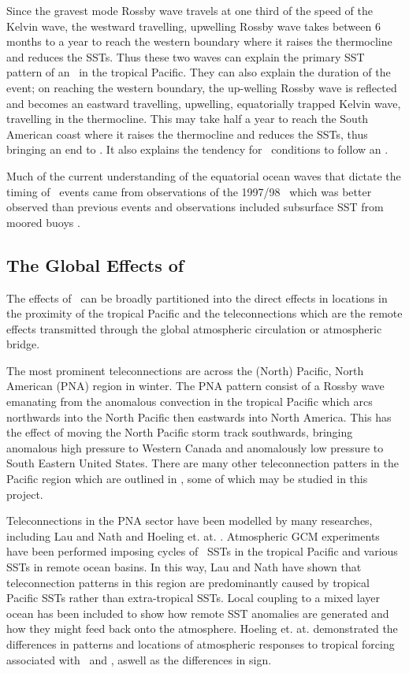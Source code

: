 Since the gravest mode Rossby wave travels at one third of the speed
of the Kelvin wave, the westward travelling, upwelling Rossby wave
takes between 6 months 
to a year to reach the western boundary where it raises the
thermocline and reduces the SSTs. Thus these two waves can explain the
primary SST pattern of an \elnino\ in the tropical Pacific. They can
also explain the duration of the event; on reaching the western
boundary, the up-welling Rossby wave is reflected and becomes an eastward
travelling, upwelling, equatorially trapped Kelvin wave, travelling in
the thermocline. This may take half a year to reach the South American
coast where it raises the thermocline and reduces the SSTs, thus
bringing an end to \elnino. It also explains the tendency for \lanina\
conditions to follow an \elnino. 

Much of the current understanding of the
equatorial ocean waves that dictate the timing of \elnino\ events
\cite{MY99, McP99} came
from observations of the 1997/98 \elnino\ which was better observed
than previous events and observations included subsurface SST from
moored buoys \cite{Nat96}. 

\subsection{The Global Effects of \elnino}

The effects of \elnino\ can be broadly partitioned into the direct
effects in locations in the proximity of the tropical Pacific and the
teleconnections which are the remote effects transmitted through the
global atmospheric circulation or atmospheric bridge. 

The most
prominent teleconnections are across the (North) Pacific, North
American (PNA) region in winter. The PNA pattern consist of a Rossby
wave emanating from the anomalous convection in the tropical Pacific
which arcs northwards into the North Pacific then eastwards into North
America. This has the effect of moving the North Pacific storm track
southwards, bringing anomalous high pressure to Western Canada and
anomalously low pressure to South Eastern United States. There are
many other teleconnection patters in the Pacific region which are
outlined in \cite{TBK+98}, some of which may be studied in this
project. 

Teleconnections in the PNA sector have been modelled by many
researches, including Lau and Nath \cite{LN94, LN96} and Hoeling
et. at. \cite{HKZ97}. Atmospheric GCM experiments have been performed
imposing cycles of \elnino\ SSTs in the tropical Pacific and various
SSTs in remote ocean basins. In this way, Lau and Nath \cite{LN94,
LN96} have shown that teleconnection patterns in this region are
predominantly caused by tropical Pacific SSTs rather than
extra-tropical SSTs. Local coupling to a mixed layer ocean has been
included to show how remote SST anomalies are generated and how they
might feed back onto the atmosphere. Hoeling
et. at. \cite{HKZ97} demonstrated the differences in patterns and
locations of atmospheric responses to tropical forcing associated with
\elnino\ and \lanina, aswell as the differences in sign. 

